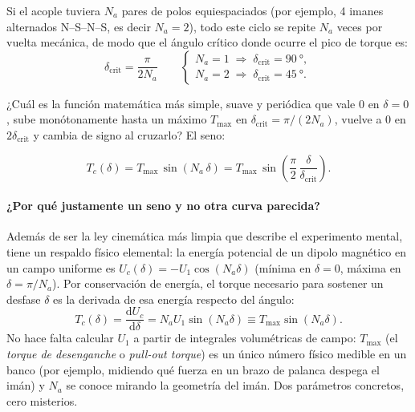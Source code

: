 \documentclass[11pt,a4paper,oneside]{book}
\newcommand{\dd}{\mathrm{d}}
\begin{document}
Si el acople tuviera $N_a$ pares de polos equiespaciados (por ejemplo, 4 imanes
alternados N--S--N--S, es decir $N_a = 2$), todo este ciclo se repite $N_a$
veces por vuelta mecánica, de modo que el ángulo crítico donde ocurre el pico de
torque es:
\begin{equation}
  \delta_{\text{crit}} = \frac{\pi}{2 N_a}
  \qquad
  \begin{cases}
    N_a = 1 \;\Longrightarrow\; \delta_{\text{crit}} = \SI{90}{\degree},\\
    N_a = 2 \;\Longrightarrow\; \delta_{\text{crit}} = \SI{45}{\degree}.
  \end{cases}
  \label{eq:delta_crit}
\end{equation}

¿Cuál es la función matemática más simple, suave y periódica que vale $0$ en
$\delta=0$, sube monótonamente hasta un máximo $T_{\max}$ en
$\delta_{\text{crit}} = \pi/(2N_a)$, vuelve a $0$ en $2\delta_{\text{crit}}$ y
cambia de signo al cruzarlo? El seno:
\begin{ecuacionclave}
\begin{equation}
  T_c(\delta) = T_{\max}\,\sin(N_a\,\delta)
              = T_{\max}\,\sin\!\left(\frac{\pi}{2}\,\frac{\delta}{\delta_{\text{crit}}}\right).
  \label{eq:acople_seno}
\end{equation}
\end{ecuacionclave}

\paragraph{¿Por qué justamente un seno y no otra curva parecida?}
Además de ser la ley cinemática más limpia que describe el experimento mental,
tiene un respaldo físico elemental: la energía potencial de un dipolo magnético
en un campo uniforme es $U_c(\delta) = -U_1\cos(N_a\delta)$ (mínima en
$\delta=0$, máxima en $\delta=\pi/N_a$). Por conservación de energía, el torque
necesario para sostener un desfase $\delta$ es la derivada de esa energía
respecto del ángulo:
\[
  T_c(\delta) = \frac{\dd U_c}{\dd\delta} = N_a U_1\sin(N_a\delta) \equiv T_{\max}\sin(N_a\delta).
\]
No hace falta calcular $U_1$ a partir de integrales volumétricas de campo:
$T_{\max}$ (el \emph{torque de desenganche} o \emph{pull-out torque}) es un
único número físico medible en un banco (por ejemplo, midiendo qué fuerza en un
brazo de palanca despega el imán) y $N_a$ se conoce mirando la geometría del
imán. Dos parámetros concretos, cero misterios.
\end{document}
